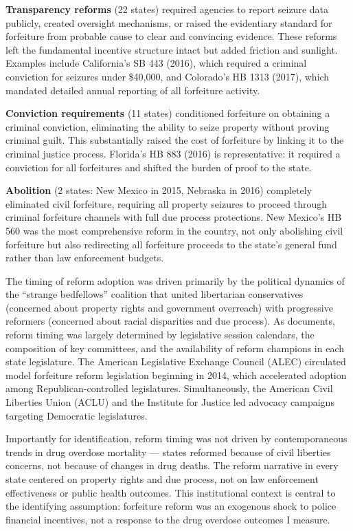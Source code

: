 \documentclass[12pt]{article}
\begin{document}
\textbf{Transparency reforms} (22 states) required agencies to report seizure data publicly, created oversight mechanisms, or raised the evidentiary standard for forfeiture from probable cause to clear and convincing evidence. These reforms left the fundamental incentive structure intact but added friction and sunlight. Examples include California's SB 443 (2016), which required a criminal conviction for seizures under \$40,000, and Colorado's HB 1313 (2017), which mandated detailed annual reporting of all forfeiture activity.

\textbf{Conviction requirements} (11 states) conditioned forfeiture on obtaining a criminal conviction, eliminating the ability to seize property without proving criminal guilt. This substantially raised the cost of forfeiture by linking it to the criminal justice process. Florida's HB 883 (2016) is representative: it required a conviction for all forfeitures and shifted the burden of proof to the state.

\textbf{Abolition} (2 states: New Mexico in 2015, Nebraska in 2016) completely eliminated civil forfeiture, requiring all property seizures to proceed through criminal forfeiture channels with full due process protections. New Mexico's HB 560 was the most comprehensive reform in the country, not only abolishing civil forfeiture but also redirecting all forfeiture proceeds to the state's general fund rather than law enforcement budgets.

The timing of reform adoption was driven primarily by the political dynamics of the ``strange bedfellows'' coalition that united libertarian conservatives (concerned about property rights and government overreach) with progressive reformers (concerned about racial disparities and due process). As \citet{carpenter2020policing} documents, reform timing was largely determined by legislative session calendars, the composition of key committees, and the availability of reform champions in each state legislature. The American Legislative Exchange Council (ALEC) circulated model forfeiture reform legislation beginning in 2014, which accelerated adoption among Republican-controlled legislatures. Simultaneously, the American Civil Liberties Union (ACLU) and the Institute for Justice led advocacy campaigns targeting Democratic legislatures.

Importantly for identification, reform timing was not driven by contemporaneous trends in drug overdose mortality --- states reformed because of civil liberties concerns, not because of changes in drug deaths. The reform narrative in every state centered on property rights and due process, not on law enforcement effectiveness or public health outcomes. This institutional context is central to the identifying assumption: forfeiture reform was an exogenous shock to police financial incentives, not a response to the drug overdose outcomes I measure.
\end{document}
